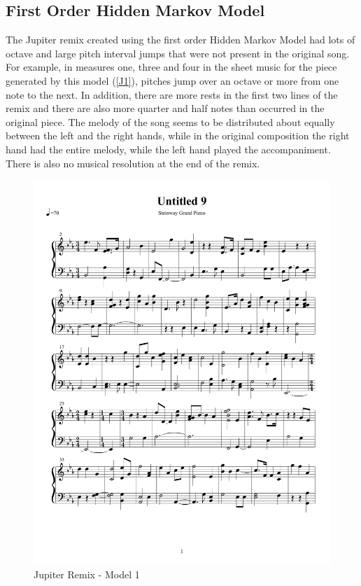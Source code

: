 \documentclass{article} %
\begin{document}
\subsection{First Order Hidden Markov Model}

The Jupiter remix created using the first order Hidden Markov Model had lots of octave and large pitch interval jumps that were not present in the original song. For example, in measures one, three and four in the sheet music for the piece generated by this model (\autoref{J1}),  pitches jump over an octave or more from one note to the next.  In addition, there are more rests in the first two lines of the remix and there are also more quarter and half notes than occurred in the original piece. The melody of the song seems to be distributed about equally between the left and the right hands, while in the original composition the right hand had the entire melody, while the left hand played the accompaniment.  There is also no musical resolution at the end of the remix.

\begin{figure}[H]
\centering

\includegraphics [scale = 0.6] {JupiterRemix-cropped.pdf}
\caption{Jupiter Remix - Model 1\label{J1}}
\end{figure}
\end{document}
